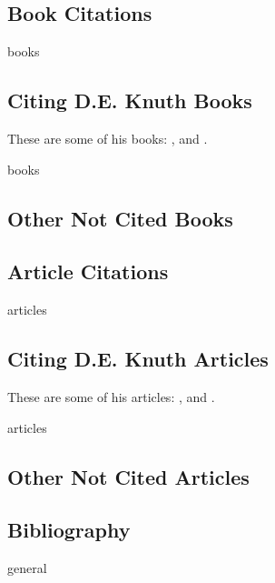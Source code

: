 \documentclass{book}
\begin{document}
	
	
	\begin{btUnit}
		\chapter{Book Citations}
		\begin{btSect}[abbrv]{books}
			\section{Citing D.E. Knuth Books}
			These are some of his books: 
			\cite{Knuth-CT}, and \cite{Knuth-ACP}.
			\btPrintCited
		\end{btSect}
		\begin{btSect}[alpha]{books}
			\section{Other Not Cited Books}
			\btPrintNotCited
		\end{btSect}
	\end{btUnit}
	
	\begin{btUnit}
		\chapter{Article Citations}
		\begin{btSect}[plain]{articles}
			\section{Citing D.E. Knuth Articles}
			These are some of his articles: 							\cite{Knuth-TB}, and \cite{Knuth-LP}.
			\btPrintCited
		\end{btSect}
		\begin{btSect}[alpha]{articles}
			\section{Other Not Cited Articles}
			\btPrintNotCited
		\end{btSect}
	\end{btUnit}
	
	\begin{btUnit}
		\chapter*{Bibliography}
		\begin{btSect}[plain]{general}
			\btPrintAll
		\end{btSect}
	\end{btUnit}
	
\end{document}
